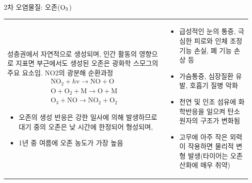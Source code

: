 \begin{frame}[t]{2차 오염물질: 오존($\rm{{O}_{3}}$)}
	\begin{tabular}{ll}
		\begin{minipage}[t]{0.475\textwidth}\scriptsize
			성층권에서 자연적으로 생성되며, 인간 활동의 영향으로 지표면 부근에서도 생성된 오존은 광화학 스모그의 주요 요소임.
				NO2의 광분해 순환과정
				$$
					\begin{array}{l}
					\mathrm{NO}_{2}+h \mathrm{v} \rightarrow \mathrm{NO}+\mathrm{O} \\
					\mathrm{O}+\mathrm{O}_{2}+\mathrm{M} \rightarrow \mathrm{O}+\mathrm{M} \\
					\mathrm{O}_{3}+\mathrm{NO} \rightarrow \mathrm{NO}_{2}+\mathrm{O}_{2}
					\end{array}
				$$

			\begin{itemize}
				\item 오존의 생성 반응은 강한 일사에 의해 발생하므로 대기 중의 오존은 낮 시간에 한정되어 형성되며, 
				\item 1년 중 여름에 오존 농도가 가장 높음
			\end{itemize}

		\end{minipage}	
		&
		\begin{minipage}[t]{0.475\textwidth} \scriptsize	
			\begin{itemize}
				\item 급성적인 눈의 통증, 극심한 피로와 인체 조정 기능 손실, 폐 기능 손상 등
				\item 가슴통증, 심장질환 유발, 호흡기 질병 악화
				\item 천연 및 인조 섬유에 화학반응을 일으켜 탄소 원자의 구조가 변화됨
				\item 고무에 아주 작은 외력이 작용하면 물리적 변형 발생(타이어는 오존 산화에 매우 취약)
			\end{itemize}
		\end{minipage}
	\end{tabular}
\end{frame}



